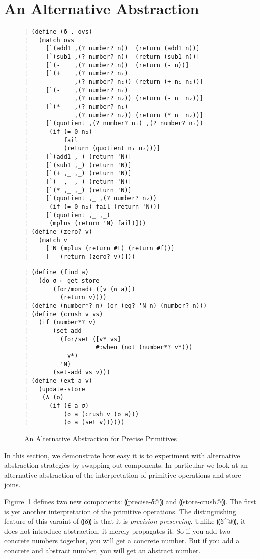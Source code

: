 \section{An Alternative Abstraction}\label{s:alt-abstraction}

\begin{figure}
\begin{lstlisting}
¦ (define (δ . ovs)
¦   (match ovs
¦     [`(add1 ,(? number? n))  (return (add1 n))]
¦     [`(sub1 ,(? number? n))  (return (sub1 n))]
¦     [`(-    ,(? number? n))  (return (- n))]
¦     [`(+    ,(? number? n₁)
¦             ,(? number? n₂)) (return (+ n₁ n₂))]
¦     [`(-    ,(? number? n₁)
¦             ,(? number? n₂)) (return (- n₁ n₂))]
¦     [`(*    ,(? number? n₁)
¦             ,(? number? n₂)) (return (* n₁ n₂))]
¦     [`(quotient ,(? number? n₁) ,(? number? n₂))
¦      (if (= 0 n₂)
¦          fail
¦          (return (quotient n₁ n₂)))]
¦     [`(add1 ,_) (return 'N)]
¦     [`(sub1 ,_) (return 'N)]
¦     [`(+ ,_ ,_) (return 'N)]
¦     [`(- ,_ ,_) (return 'N)]
¦     [`(* ,_ ,_) (return 'N)]
¦     [`(quotient ,_ ,(? number? n₂))
¦      (if (= 0 n₂) fail (return 'N))]
¦     [`(quotient ,_ ,_)
¦      (mplus (return 'N) fail)]))
¦ (define (zero? v)
¦   (match v
¦     ['N (mplus (return #t) (return #f))]
¦     [_  (return (zero? v))]))
\end{lstlisting}
\figskip{}
\begin{lstlisting}
¦ (define (find a)
¦   (do σ ← get-store
¦       (for/monad+ ([v (σ a)])
¦         (return v))))
¦ (define (number*? n) (or (eq? 'N n) (number? n)))
¦ (define (crush v vs)
¦   (if (number*? v)
¦       (set-add 
¦         (for/set ([v* vs] 
¦                   #:when (not (number*? v*))) 
¦           v*) 
¦         'N)
¦       (set-add vs v)))
¦ (define (ext a v)
¦   (update-store
¦    (λ (σ)
¦      (if (∈ a σ)
¦          (σ a (crush v (σ a)))
¦          (σ a (set v))))))
\end{lstlisting}
\caption{An Alternative Abstraction for Precise Primitives}
\label{f:pres-delta}
\end{figure}

In this section, we demonstrate how easy it is to experiment with
alternative abstraction strategies by swapping out components.  In
particular we look at an alternative abstraction of the interpretation
of primitive operations and store joins.

Figure~\ref{f:pres-delta} defines two new components:
⸨precise-δ@⸩ and ⸨store-crush@⸩.  The first is yet
another interpretation of the primitive operations.  The
distinguishing feature of this varaint of ⸨δ⸩ is that it is
\emph{precision preserving}.  Unlike ⸨δ^@⸩, it does not
introduce abstraction, it merely propagates it.  So if you add two
concrete numbers together, you will get a concrete number.  But if you
add a concrete and abstract number, you will get an abstract number.

